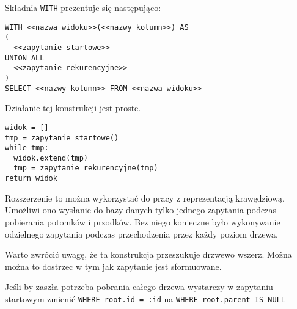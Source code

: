 
Składnia \texttt{WITH} prezentuje się następująco:

\begin{verbatim}
WITH <<nazwa widoku>>(<<nazwy kolumn>>) AS
(
  <<zapytanie startowe>>
UNION ALL
  <<zapytanie rekurencyjne>>
)
SELECT <<nazwy kolumn>> FROM <<nazwa widoku>>
\end{verbatim}

Działanie tej konstrukcji jest proste.

\begin{verbatim}
widok = []
tmp = zapytanie_startowe()
while tmp:
  widok.extend(tmp)
  tmp = zapytanie_rekurencyjne(tmp)
return widok
\end{verbatim}

Rozszerzenie to można wykorzystać do pracy z reprezentacją krawędziową. 
Umożliwi ono wysłanie do bazy danych tylko jednego zapytania podczas pobierania potomków i przodków. 
Bez niego konieczne było wykonywanie odzielnego zapytania podczas przechodzenia przez każdy poziom drzewa.






Warto zwrócić uwagę, że ta konstrukcja przeszukuje drzwewo wszerz. Można można to dostrzec w tym jak zapytanie jest sformuowane. 

Jeśli by zaszła potrzeba pobrania całego drzewa wystarczy w zapytaniu startowym zmienić \texttt{WHERE root.id = :id} na \texttt{WHERE root.parent IS NULL}


